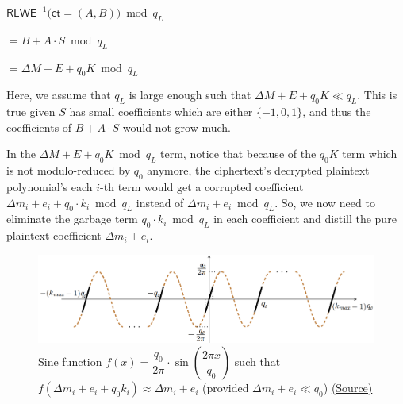 $\textsf{RLWE}^{-1}\textbf{(}\textsf{ct} = (A, B)\textbf{)} \bmod q_L$

$ = B + A\cdot S \bmod q_L$

$= \Delta M + E + q_0 K \bmod q_L$

Here, we assume that $q_L$ is large enough such that $\Delta M + E + q_0K \ll q_L$. This is true given $S$ has small coefficients which are either $\{-1, 0, 1\}$, and thus the coefficients of $B + A\cdot S$ would not grow much. 


In the $\Delta M + E + q_0 K \bmod q_L$ term, notice that because of the $q_0K$ term which is not modulo-reduced by $q_0$ anymore, the ciphertext's decrypted plaintext polynomial's each $i$-th term would get a corrupted coefficient $\Delta m_i + e_i + q_0\cdot k_i \bmod q_L$ instead of $\Delta m_i + e_i \bmod q_L$. So, we now need to eliminate the garbage term $q_0\cdot k_i \bmod q_L$ in each coefficient and distill the pure plaintext coefficient $\Delta m_i + e_i$.


\begin{figure}[h!]
    \centering
  \includegraphics[width=1.0\linewidth]{figures/modulo-reduction-sine.png}
  \caption{Sine function $f(x) = \dfrac{q_0}{2\pi}\cdot \sin \left(\dfrac{2\pi x}{q_0}\right)$ such that $f(\Delta m_i + e_i + q_0k_i) \approx \Delta m_i + e_i$ (provided $\Delta m_i + e_i \ll q_0$) \href{https://eprint.iacr.org/2018/153.pdf}{(Source)}}
  \label{fig:modulo-reduction-sine}
\end{figure}
